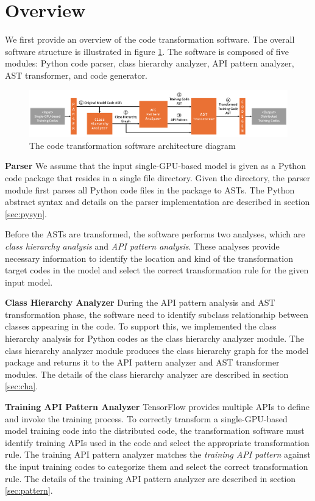 \section{Overview}

We first provide an overview of the code transformation software.
The overall software structure is illustrated in figure \ref{sysarch}.
The software is composed of five modules: Python code parser,
class hierarchy analyzer, API pattern analyzer, AST transformer,
and code generator.

\begin{figure}[h]
  \includegraphics[width=1\textwidth]{system_arch}
  \caption{The code transformation software architecture diagram}
  \label{sysarch}
\end{figure}

\textbf{Parser}
We assume that the input single-GPU-based model is given as a Python code
package that resides in a single file directory.
Given the directory, the parser module first parses all Python code files
in the package to ASTs.
The Python abstract syntax and details on the parser implementation
are described in section \ref{sec:pysyn}.

Before the ASTs are transformed, the software performs two analyses, 
which are \textit{class hierarchy analysis} and 
\textit{API pattern analysis}.
These analyses provide necessary information to identify the
location and kind of the transformation target codes in the model
and select the correct transformation rule for the given input model.

\textbf{Class Hierarchy Analyzer}
During the API pattern analysis and AST transformation phase,
the software need to identify subclass relationship between
classes appearing in the code.
To support this, we implemented the class hierarchy analysis
for Python codes as the class hierarchy analyzer module.
The class hierarchy analyzer module produces the class hierarchy graph
for the model package and returns it to the API pattern analyzer and 
AST transformer modules. The details of the class hierarchy analyzer are
described in section \ref{sec:cha}.

\textbf{Training API Pattern Analyzer}
TensorFlow provides multiple APIs to define and invoke the training process.
To correctly transform a single-GPU-based model training code into
the distributed code, the transformation software must identify
training APIs used in the code and select the appropriate transformation rule.
The training API pattern analyzer matches the \textit{training API pattern}
against the input training codes to categorize them and select
the correct transformation rule. The details of the training API pattern
analyzer are described in section \ref{sec:pattern}.

